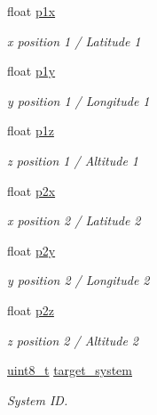 \begin{DoxyCompactItemize}
\item 
float \hyperlink{struct____mavlink__safety__set__allowed__area__t_acf2cef0f070243c5e89a64f6f2ca413f}{p1x}
\begin{DoxyCompactList}\small\item\em x position 1 / Latitude 1 \end{DoxyCompactList}\item 
float \hyperlink{struct____mavlink__safety__set__allowed__area__t_a9cc53ebb50e264875c81df3671735dbe}{p1y}
\begin{DoxyCompactList}\small\item\em y position 1 / Longitude 1 \end{DoxyCompactList}\item 
float \hyperlink{struct____mavlink__safety__set__allowed__area__t_a290829bbd18c41b9d559d2c35850b919}{p1z}
\begin{DoxyCompactList}\small\item\em z position 1 / Altitude 1 \end{DoxyCompactList}\item 
float \hyperlink{struct____mavlink__safety__set__allowed__area__t_aca63129651b0cc2d7394216782d9f721}{p2x}
\begin{DoxyCompactList}\small\item\em x position 2 / Latitude 2 \end{DoxyCompactList}\item 
float \hyperlink{struct____mavlink__safety__set__allowed__area__t_a6cab84234ced01ba0108e81a0147df09}{p2y}
\begin{DoxyCompactList}\small\item\em y position 2 / Longitude 2 \end{DoxyCompactList}\item 
float \hyperlink{struct____mavlink__safety__set__allowed__area__t_a9609ca1370ee08e0acfb658d37bfa6d1}{p2z}
\begin{DoxyCompactList}\small\item\em z position 2 / Altitude 2 \end{DoxyCompactList}\item 
\hyperlink{stdint_8h_aba7bc1797add20fe3efdf37ced1182c5}{uint8\-\_\-t} \hyperlink{struct____mavlink__safety__set__allowed__area__t_acd133dd7eb95a5846b4354acdb74bef1}{target\-\_\-system}
\begin{DoxyCompactList}\small\item\em System I\-D. \end{DoxyCompactList}\item 

\end{DoxyCompactItemize}
